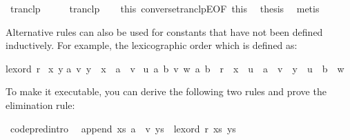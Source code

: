 \begin{isabellebody}
\ tranclp\isanewline
{}\isamarkupfalse%
\ {\isacharminus}\isanewline
\ \ \isamarkupfalse%
\ tranclp\isanewline
\ \ \isamarkupfalse%
\ this\ converse{\isacharunderscore}tranclpE{\isacharbrackleft}OF\ this{\isacharparenleft}{}{\isacharparenright}{\isacharbrackright}\ \isamarkupfalse%
\ thesis\ \isamarkupfalse%
\ metis\isanewline
{}\isamarkupfalse%
%
\endisatagquote
{\isafoldquote}%
%
\isadelimquote
%
\endisadelimquote
%
\begin{isamarkuptext}%
\noindent Alternative rules can also be used for constants that have not
been defined inductively. For example, the lexicographic order which
is defined as:%
\end{isamarkuptext}%
\isamarkuptrue%
%
\isadelimquote
%
\endisadelimquote
%
\isatagquote
%
\begin{isamarkuptext}%
\begin{isabelle}%
lexord\ r\ {\isacharequal}\isanewline
{\isacharbraceleft}{\isacharparenleft}x{\isacharcomma}\ y{\isacharparenright}{\isachardot}\isanewline
\isaindent{\ }{\isasymexists}a\ v{\isachardot}\ y\ {\isacharequal}\ x\ {\isacharat}\ a\ {\isacharhash}\ v\ {\isasymor}\isanewline
{}u\ a\ b\ v\ w{\isachardot}\ {\isacharparenleft}a{\isacharcomma}\ b{\isacharparenright}\ {\isasymin}\ r\ {\isasymand}\ x\ {\isacharequal}\ u\ {\isacharat}\ a\ {\isacharhash}\ v\ {\isasymand}\ y\ {\isacharequal}\ u\ {\isacharat}\ b\ {\isacharhash}\ w{\isacharparenright}{\isacharbraceright}%
\end{isabelle}%
\end{isamarkuptext}%
\isamarkuptrue%
%
\endisatagquote
{\isafoldquote}%
%
\isadelimquote
%
\endisadelimquote
%
\begin{isamarkuptext}%
\noindent To make it executable, you can derive the following two rules and prove the
elimination rule:%
\end{isamarkuptext}%
\isamarkuptrue%
%
\isadelimproof
%
\endisadelimproof
%
\isatagproof
%
\endisatagproof
{\isafoldproof}%
%
\isadelimproof
%
\endisadelimproof
%
\isadelimquote
%
\endisadelimquote
%
\isatagquote
{}\isamarkupfalse%
\ {\isacharbrackleft}code{\isacharunderscore}pred{\isacharunderscore}intro{\isacharbrackright}{\isacharcolon}\isanewline
\ \ {\isachardoublequoteopen}append\ xs\ {\isacharparenleft}a\ {\isacharhash}\ v{\isacharparenright}\ ys\ {\isasymLongrightarrow}\ lexord\ r\ {\isacharparenleft}xs{\isacharcomma}\ ys{\isacharparenright}{\isachardoublequoteclose}\isanewline

\end{isabellebody}

